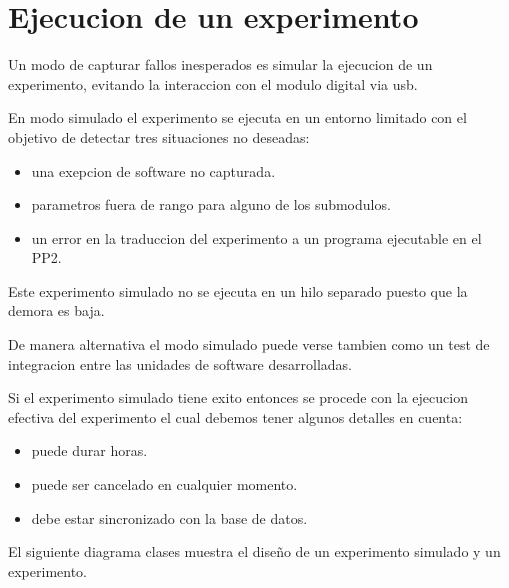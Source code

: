 \section{Ejecucion de un experimento}

Un modo de capturar fallos inesperados es simular la ejecucion de un experimento,
evitando la interaccion con el modulo digital via usb.

En modo simulado el experimento se ejecuta en un entorno limitado con el objetivo de detectar 
tres situaciones no deseadas:

\begin{itemize}
\item una exepcion de software no capturada.
\item parametros fuera de rango para alguno de los submodulos.
\item un error en la traduccion del experimento a un programa ejecutable en el PP2.
\end{itemize}

Este experimento simulado no se ejecuta en un hilo separado puesto que la demora es baja.

De manera alternativa el modo simulado puede verse tambien como un test de integracion
entre las unidades de software desarrolladas.

Si el experimento simulado tiene exito entonces se procede con la ejecucion efectiva del experimento
el cual debemos tener algunos detalles en cuenta:

\begin{itemize}
    \item puede durar horas.
    \item puede ser cancelado en cualquier momento.
    \item debe estar sincronizado con la base de datos.
\end{itemize}

El siguiente diagrama clases muestra el diseño de un experimento simulado y un experimento.

\newpage
